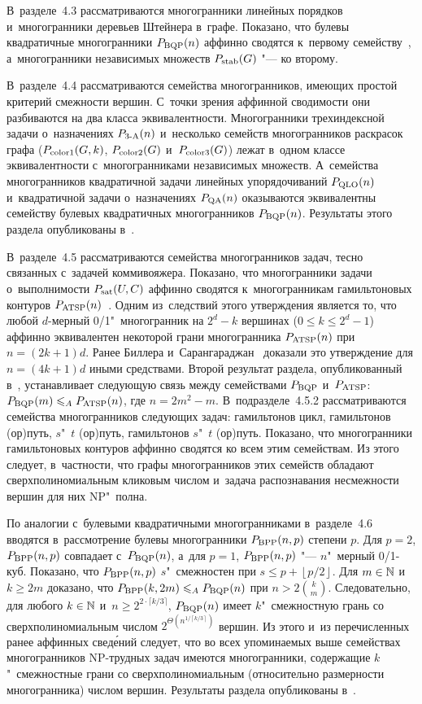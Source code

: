 В~разделе~4.3 рассматриваются многогранники линейных порядков и~многогранники деревьев Штейнера в~графе. Показано, что булевы квадратичные многогранники $P_{\textup{BQP}}(n)$ аффинно сводятся к~первому семейству~, а~многогранники независимых множеств $P_{\textup{stab}}(G)$ "--- ко второму.

В~разделе~4.4 рассматриваются семейства многогранников, имеющих простой критерий смежности вершин. С~точки зрения аффинной сводимости они разбиваются на два класса эквивалентности.
Многогранники трехиндексной задачи о~назначениях $P_{\textup{3-A}}(n)$ и~несколько семейств многогранников раскрасок графа ($P_{\textup{color1}}(G,k)$, $P_{\textup{color2}}(G)$ и~$P_{\textup{color3}}(G)$) лежат в~одном классе эквивалентности с~многогранниками независимых множеств. А~семейства многогранников квадратичной задачи линейных упорядочиваний $P_{\textup{QLO}}(n)$ и~квадратичной задачи о~назначениях $P_{\textup{QA}}(n)$ оказываются эквивалентны семейству булевых квадратичных многогранников $P_{\textup{BQP}}(n)$.
Результаты этого раздела опубликованы в~.

В~разделе~4.5 рассматриваются семейства многогранников задач, тесно связанных с~задачей коммивояжера.
Показано, что многогранники задачи о~выполнимости $P_{\textup{sat}}(U,C)$ аффинно сводятся к~многогранникам гамильтоновых контуров $P_{\textup{ATSP}}(n)$~.
Одним из~следствий этого утверждения является то, что любой $d$-мерный 0/1"~многогранник на $2^d - k$ вершинах ($0 \le k \le 2^d - 1$) аффинно эквивалентен некоторой грани многогранника $P_{\textup{ATSP}}(n)$ при $n = (2k+1)d$.
Ранее Биллера и~Сарангараджан~\cite{Billera:1996} доказали это утверждение для $n = (4k+1)d$ иными средствами.
Второй результат раздела, опубликованный в~, устанавливает следующую связь между семействами $P_{\textup{BQP}}$ и~$P_{\textup{ATSP}}$:
$P_{\textup{BQP}}(m) \leqslant_A P_{\textup{ATSP}}(n)$, где $n = 2 m^2 - m$.
В~подразделе~4.5.2 рассматриваются семейства многогранников следующих задач: гамильтонов цикл, гамильтонов (ор)путь, $s$"~$t$ (ор)путь, гамильтонов $s$"~$t$ (ор)путь.
Показано, что многогранники гамильтоновых контуров аффинно сводятся ко всем этим семействам. Из этого следует, в~частности, что графы многогранников этих семейств обладают сверхполиномиальным кликовым числом и~задача распознавания несмежности вершин для них NP"~полна.

По аналогии с~булевыми квадратичными многогранниками в~разделе~4.6 вводятся в~рассмотрение булевы многогранники $P_{\textup{BPP}}(n,p)$ степени $p$. 
Для $p=2$, $P_{\textup{BPP}}(n,p)$ совпадает с~$P_{\textup{BQP}}(n)$, а~для $p=1$, $P_{\textup{BPP}}(n,p)$ "--- $n$"~мерный 0/1-куб.
Показано, что $P_{\textup{BPP}}(n,p)$ $s$"~смежностен при
$s \le p + \left\lfloor p / 2 \right\rfloor$.
Для $m \in \mathbb{N}$ и~$k \ge 2m$ доказано, что $P_{\textup{BPP}}(k,2m) \leqslant_A P_{\textup{BQP}}(n)$ при $n > 2 \binom{k}{m}$.
Следовательно, для любого $k \in \mathbb{N}$ и~$n \ge 2^{2\cdot \lceil k/3\rceil}$, 
$P_{\textup{BQP}}(n)$ имеет $k$"~смежностную грань со сверхполиномиальным числом
$2^{{\Theta}\left( n^{1 / {\left\lceil k/3\right\rceil}}\right)}$ вершин.
Из этого и~из перечисленных ранее аффинных свед\'{е}ний следует, что во всех упоминаемых выше семействах многогранников NP-трудных задач имеются многогранники, содержащие $k$"~смежностные грани со сверхполиномиальным (относительно размерности многогранника) числом вершин. Результаты раздела опубликованы в~.

